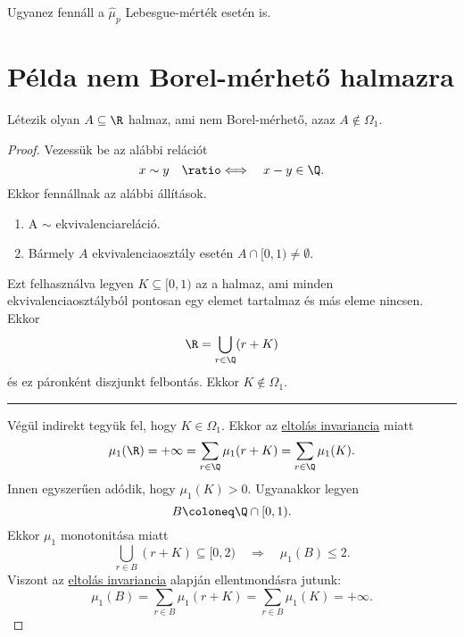 \documentclass[
]{elteikthesis}[2024/04/26]
\begin{document}
	\begin{note}
		Ugyanez fennáll a \( \widehat{\mu}_p \) Lebesgue-mérték esetén is.
	\end{note}
	
	\newpage
	\section{Példa nem Borel-mérhető halmazra}
	
	\begin{statement}{}{}
		Létezik olyan \( A \subseteq \R \) halmaz, ami nem Borel-mérhető, 
		azaz \( A \notin \Omega_1. \)
	\end{statement}
	\begin{proof}
		Vezessük be az alábbi relációt
		\[
			x \sim y
			\quad \ratio\Longleftrightarrow \quad
			x - y \in \Q.
		\]
		Ekkor fennállnak az alábbi állítások.
		\begin{enumerate}
			\item A \( \sim \) ekvivalenciareláció.
			\item Bármely \( A \) ekvivalenciaosztály esetén \( A \cap [0, 1) \neq \emptyset \).
		\end{enumerate}
		Ezt felhasználva legyen \( K \subseteq [0, 1) \) az a halmaz, 
		ami minden ekvivalenciaosztályból pontosan egy elemet tartalmaz és más eleme nincsen.
		Ekkor
		\[
			\R = \bigcup_{r \in \Q} (r + K)
		\]
		és ez páronként diszjunkt felbontás. Ekkor \( K \notin \Omega_1 \).
		
		\vspace{9pt}
		\hrule
		\vspace{9pt}
		
		Végül indirekt tegyük fel, hogy \( K \in \Omega_1 \).
		Ekkor az \hyperref[st:eltolás-tükrözés-invariancia]{eltolás invariancia} miatt
		\[
			\mu_1( \R ) = 
			+\infty =
			\sum_{r \in \Q} \mu_1(r + K) = 
			\sum_{r \in \Q} \mu_1(K).
		\]
		Innen egyszerűen adódik, hogy \( \mu_1(K) > 0 \). Ugyanakkor legyen
		\[
			B \coloneq \Q \cap [0, 1).
		\]
		Ekkor \( \mu_1 \) monotonitása miatt
		\[
			\bigcup_{r \in B} (r + K) \subseteq [0, 2)
			\quad \Longrightarrow \quad
			\mu_1(B) \leq 2.
		\]
		Viszont az \hyperref[st:eltolás-tükrözés-invariancia]{eltolás invariancia} alapján
		ellentmondásra jutunk:
		\[
			\mu_1(B) =
			\sum_{r \in B} \mu_1(r + K) =
			\sum_{r \in B} \mu_1(K) =
			+\infty.
		\]
	\end{proof}
	
\end{document}
